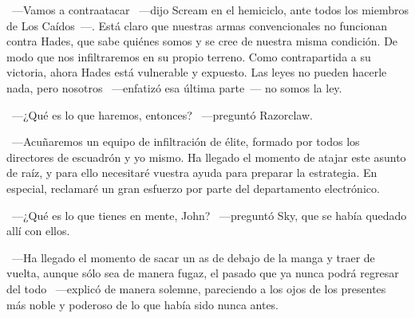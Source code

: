 ~---Vamos a contraatacar ~---dijo Scream en el hemiciclo, ante todos los miembros de Los Caídos~---. Está claro que nuestras armas convencionales no funcionan contra Hades, que sabe quiénes somos y se cree de nuestra misma condición. De modo que nos infiltraremos en su propio terreno. Como contrapartida a su victoria, ahora Hades está vulnerable y expuesto. Las leyes no pueden hacerle nada, pero nosotros ~---enfatizó esa última parte~--- no somos la ley.

~---¿Qué es lo que haremos, entonces? ~---preguntó Razorclaw.

~---Acuñaremos un equipo de infiltración de élite, formado por todos los directores de escuadrón y yo mismo. Ha llegado el momento de atajar este asunto de raíz, y para ello necesitaré vuestra ayuda para preparar la estrategia. En especial, reclamaré un gran esfuerzo por parte del departamento electrónico.

~---¿Qué es lo que tienes en mente, John? ~---preguntó Sky, que se había quedado allí con ellos.

~---Ha llegado el momento de sacar un as de debajo de la manga y traer de vuelta, aunque sólo sea de manera fugaz, el pasado que ya nunca podrá regresar del todo ~---explicó de manera solemne, pareciendo a los ojos de los presentes más noble y poderoso de lo que había sido nunca antes.

\endinput
